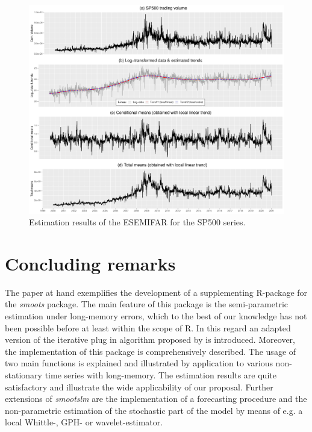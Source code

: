 \documentclass[12pt]{article}
\begin{document}
 
 \begin{figure}[h!]
 	\includegraphics[trim = {0cm 0mm 0mm 0mm}, width = \textwidth]{Abb/SP500VOL.pdf}
 	\caption{Estimation results of the ESEMIFAR for the SP500 series.}
 \end{figure}


\section{Concluding remarks}
The paper at hand exemplifies the development of a supplementing R-package for the \textit{smoots} package. The main feature of this package is the semi-parametric estimation under long-memory errors, which to the best of our knowledge has not been possible before at least within the scope of R. In this regard an adapted version of the iterative plug in algorithm proposed by \citet{beran2002iterative} is introduced. Moreover, the implementation of this package is comprehensively described. The usage of two main functions is explained and illustrated by application to various non-stationary time series with long-memory. The estimation results are quite satisfactory and illustrate the wide applicability of our proposal. Further extensions of \textit{smootslm} are the implementation of a forecasting procedure and the non-parametric estimation of the stochastic part of the model by means of e.g.  a local Whittle-, GPH- or wavelet-estimator.

\clearpage

\printbibliography


\clearpage
\end{document}
